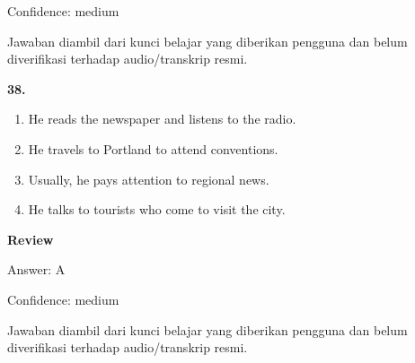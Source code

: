 \documentclass[12pt]{article}
\begin{document}
Confidence: medium\par
Jawaban diambil dari kunci belajar yang diberikan pengguna dan belum diverifikasi terhadap audio/transkrip resmi.\par
\endgroup
\par
\vspace{0.25\baselineskip}
\noindent\textbf{38.}
\begin{enumerate}[label=(\Alph*),leftmargin=*,itemsep=0.2em]
\item He reads the newspaper and listens to the radio.
\item He travels to Portland to attend conventions.
\item Usually, he pays attention to regional news.
\item He talks to tourists who come to visit the city.
\end{enumerate}
\par
\begingroup
\setlength{\parskip}{0pt}
\setlength{\parindent}{0pt}
\textbf{Review}\par
Answer: A\par
Confidence: medium\par
Jawaban diambil dari kunci belajar yang diberikan pengguna dan belum diverifikasi terhadap audio/transkrip resmi.\par
\endgroup
\par
\vspace{0.25\baselineskip}
\end{document}

